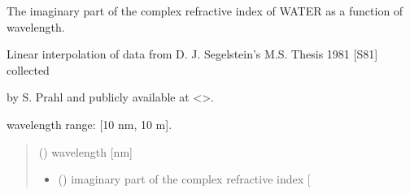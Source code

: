 \documentclass[letterpaper,10pt,english]{sphinxmanual}
\begin{document}
\begin{fulllineitems}
\label{\detokenize{03_absorption_coefficient:skinoptics.absorption_coefficient.k_wat_Segelstein}}
\pysigstartsignatures
{}
\pysigstopsignatures
\begin{DUlineblock}{0em}
\item[] The imaginary part of the complex refractive index of WATER as a function of wavelength.
\item[] Linear interpolation of data from D. J. Segelstein’s M.S. Thesis 1981 {[}S81{]} collected
\item[] by S. Prahl and publicly available at \textless{}\textgreater{}.
\end{DUlineblock}

\begin{DUlineblock}{0em}
\item[] wavelength range: {[}10 nm, 10 m{]}.
\end{DUlineblock}
\begin{quote}\begin{description}
\sphinxAtStartPar
{} () \textendash{} wavelength {[}nm{]}

\sphinxAtStartPar
\begin{itemize}
\item {} 
\sphinxAtStartPar
{} () \textendash{} imaginary part of the complex refractive index {[}\sphinxhyphen{}{]}

\end{itemize}


\end{description}\end{quote}

\end{fulllineitems}

\end{document}
